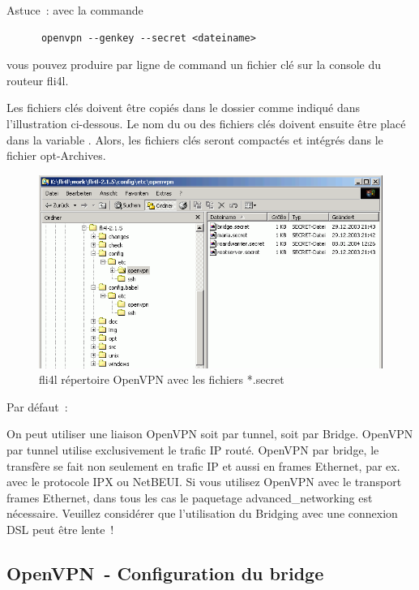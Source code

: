\begin{description}
  Astuce~: avec la commande
  \begin{verbatim}
      openvpn --genkey --secret <dateiname>
  \end{verbatim}
  vous pouvez produire par ligne de command un fichier clé sur la console du routeur fli4l.

  Les fichiers clés doivent être copiés dans le dossier 
  comme indiqué dans l'illustration ci-dessous. Le nom du ou des fichiers clés doivent
  ensuite être placé dans la variable . Alors, les fichiers
  clés seront compactés et intégrés dans le fichier opt-Archives.

  \begin{figure}[htbp]
    \centering
    \includegraphics[width=\columnwidth]{config_etc_openvpn}
    \caption{fli4l répertoire OpenVPN avec les fichiers *.secret}
    \label{fig:config_etc_openvpn}
  \end{figure}


  Par défaut~: 

  On peut utiliser une liaison OpenVPN soit par tunnel, soit par Bridge. OpenVPN
  par tunnel utilise exclusivement le trafic IP routé. OpenVPN par bridge, le
  transfère se fait non seulement en trafic IP et aussi en frames Ethernet,
  par ex. avec le protocole IPX ou NetBEUI. Si vous utilisez OpenVPN avec le
  transport frames Ethernet, dans tous les cas le paquetage advanced\_networking
  est nécessaire. Veuillez considérer que l'utilisation du Bridging avec une
  connexion DSL peut être lente~!

\end{description}


\subsection{OpenVPN~- Configuration du bridge}

